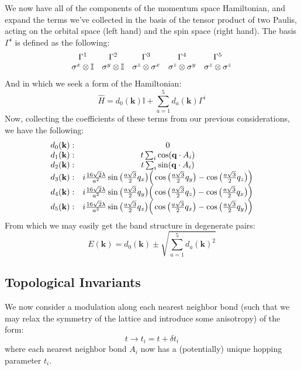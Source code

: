 \documentclass[10pt,a4paper]{article}
\begin{document}
\begin{multicols}{2}
We now have all of the components of the momentum space Hamiltonian, and expand the terms we've collected in the basis of the tensor product of two Paulis, acting on the orbital space (left hand) and the spin space (right hand). The basis $\Gamma^{i}$ is defined as the following:
$$
\begin{array}{c  c  c  c  c}
\Gamma^1&\Gamma^2&\Gamma^3&\Gamma^4&\Gamma^5\\
\sigma^x\otimes \mathbb{I} &\sigma^y\otimes \mathbb{I} 
&\sigma^z\otimes \sigma^x &\sigma^z\otimes \sigma^y
 &\sigma^z\otimes \sigma^z \\
\end{array}
$$
And in which we seek a form of the  Hamiltonian:
$$
\hat{H}=d_0(\mathbf{k})\mathbb{I} + \sum_{a=1}^5 d_a(\mathbf{k})\Gamma^i
$$
Now, collecting the coefficients of these terms from our previous considerations, we have the following:
\footnotesize
$$
\begin{array}{l c}
d_0(\mathbf{k}):& 0\\
d_1(\mathbf{k}):& t\sum_{i}\cos(\mathbf{q}\cdot A_i) \\
d_2(\mathbf{k}):& t\sum_{i}\sin(\mathbf{q}\cdot A_i)\\
d_3(\mathbf{k}):& i\frac{16\sqrt{2}\lambda}{a^2}\sin\big( \frac{a\sqrt{3}}{2} q_x\big) \Big( \cos\big( \frac{a\sqrt{3}}{2} q_y\big) -\cos\big( \frac{a\sqrt{3}}{2} q_z\big) \Big)  \\
d_4(\mathbf{k}):&  i\frac{16\sqrt{2}\lambda}{a^2}\sin\big( \frac{a\sqrt{3}}{2} q_y\big) \Big( \cos\big( \frac{a\sqrt{3}}{2} q_z\big) -\cos\big( \frac{a\sqrt{3}}{2} q_x\big) \Big)\\
d_5(\mathbf{k}):& i\frac{16\sqrt{2}\lambda}{a^2}\sin\big( \frac{a\sqrt{3}}{2} q_z\big) \Big( \cos\big( \frac{a\sqrt{3}}{2} q_x\big) -\cos\big( \frac{a\sqrt{3}}{2} q_y\big) \Big)\\
\end{array}
$$\normalsize
From which we may easily get the band structure in degenerate pairs:
$$
E(\mathbf{k}) = d_0(\mathbf{k})\pm \sqrt{ \sum_{a=1}^5 d_a(\mathbf{k})^2}
$$

\subsection{Topological Invariants}
We now consider a modulation along each nearest neighbor bond (such that we may relax the symmetry of the lattice and introduce some anisotropy) of the form:
$$
t\rightarrow t_i= t+\delta t_i
$$
where each nearest neighbor bond $A_i$ now has a (potentially) unique hopping parameter $t_i$.


\end{multicols}
\end{document}
